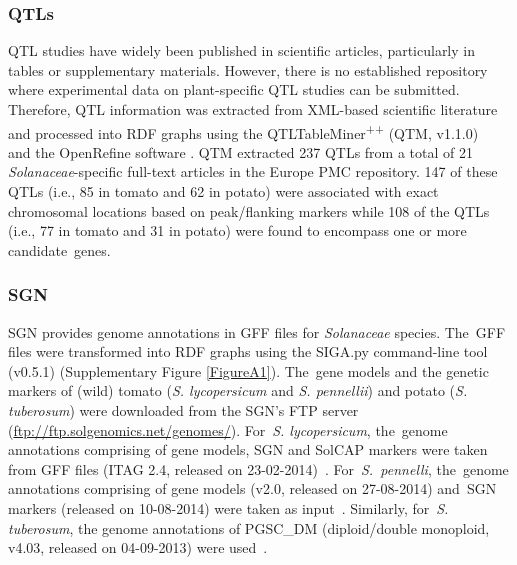 \documentclass[applsci,article,accept,moreauthors,pdftex]{Definitions/mdpi}
\begin{document}
{\subsubsection{QTLs}
QTL studies have widely been published in scientific articles, particularly in tables or supplementary materials. However, there is no established repository where experimental data on plant-specific QTL studies can be submitted.
Therefore, QTL information was %
extracted from XML-based %
scientific literature and processed into RDF graphs \cite{QTLs} %
using the QTLTableMiner\textsuperscript{++} (QTM, v1.1.0)~\cite{singh2018qtltableminer++, QTM}
and the OpenRefine software \cite{OpenRefine}.
QTM extracted 237 QTLs from a total of 21 \textit{Solanaceae}-specific full-text articles in the Europe PMC repository. %
147 of these QTLs (i.e., 85 in tomato and 62 in potato) were associated with exact chromosomal locations based on peak/flanking markers while 108 of the QTLs (i.e., 77 in tomato and 31 in potato) were found to encompass one or more candidate~genes. %

\subsubsection{SGN}
SGN provides genome annotations in GFF files for \textit{Solanaceae} %
species. The~GFF files were transformed into RDF graphs \cite{GAs} %
using the SIGA.py command-line tool (v0.5.1) \cite{SIGA} %
(Supplementary Figure \ref{FigureA1}). %
 The~gene models and the genetic markers of (wild) tomato (\textit{S. lycopersicum} and \textit{S. pennellii}) and potato (\textit{S. tuberosum}) were downloaded from the SGN’s FTP server (\url{ftp://ftp.solgenomics.net/genomes/}).
 For~\textit{S. lycopersicum}, the~genome annotations comprising of gene models, SGN and SolCAP markers %
 were taken from GFF files (ITAG 2.4, released on 23-02-2014)~\cite{SGN:SL}. %
 For~\textit{S.~pennelli}, the~genome annotations comprising of gene models (v2.0, released on 27-08-2014) %
 and~SGN markers (released on 10-08-2014) %
 were taken as input~\cite{SGN:SP}. %
 Similarly, for~\textit{S. tuberosum}, the genome annotations %
 of PGSC{\_}DM (diploid/double monoploid, v4.03, released on 04-09-2013) %
 were used~\cite{SGN:ST}. %

}
\end{document}

